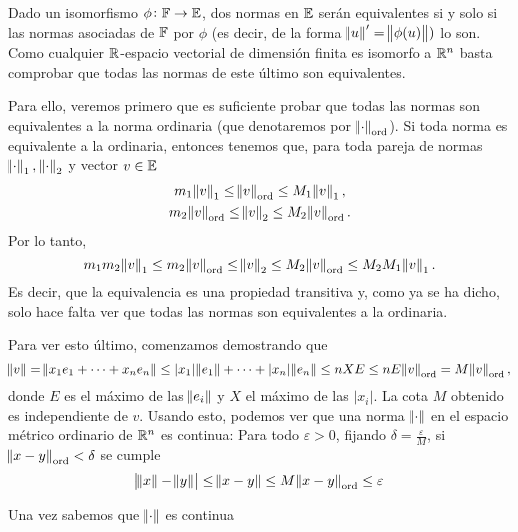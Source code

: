 \begin{eje}
    Dado un isomorfismo $\phi \colon \mathbb{F} \to \mathbb{E}$, dos normas en $\mathbb{E}$ serán equivalentes
    si y solo si las normas asociadas de $\mathbb{F}$ por $\phi$ (es decir, de la forma 
    $\norm{u}'=\norm{\phi(u)})$ lo son.
    Como cualquier $\mathbb{R}$-espacio vectorial de dimensión finita es isomorfo a $\mathbb{R}^n$
    basta comprobar que todas las normas de este último son equivalentes. 

    Para ello, veremos primero que es suficiente probar que todas las normas son 
    equivalentes a la norma ordinaria (que denotaremos por $\norm{\cdot}_{\text{ord}}$). 
    Si toda norma es equivalente a la ordinaria, entonces tenemos que, para toda pareja
    de normas $\norm{\cdot}_1,\,\norm{\cdot}_2$ y vector $v \in \mathbb{E}$ 
    \begin{gather*}
        m_1 \norm{v}_1 \leq \norm{v}_{\text{ord}} \leq M_1 \norm{v}_1, \\
        m_2 \norm{v}_{\text{ord}} \leq \norm{v}_2 \leq M_2 \norm{v}_{\text{ord}}.\\
    \end{gather*}
    Por lo tanto,
    \[
        m_1 m_2 \norm{v}_1 \leq m_2 \norm{v}_{\text{ord}} \leq \norm{v}_2 \leq 
        M_2 \norm{v}_{\text{ord}} \leq M_2  M_1 \norm{v}_1.
    \]
    Es decir, que la equivalencia es una propiedad transitiva y, como ya se ha dicho,
    solo hace falta ver que todas las normas son equivalentes a la ordinaria.

    Para ver esto último, comenzamos demostrando que
    \[
        \norm{v} = \norm{x_1e_1 + \dots + x_ne_n} \leq |x_1|\norm{e_1} + \dots + |x_n|
        \norm{e_n} \leq nXE \leq nE \norm{v}_{\text{ord}}=M\norm{v}_{\text{ord}},
    \]
    donde $E$ es el máximo de las $\norm{e_i}$ y $X$ el máximo de las $|x_i|$.
    La cota $M$ obtenido es independiente de $v$.
    Usando esto, podemos ver que una norma $\norm{\cdot}$
    en el espacio métrico ordinario de $\mathbb{R}^n$ es continua:
    Para todo $\varepsilon > 0$, fijando $\delta = \frac{\varepsilon}{M}$, si
    $\norm{x-y}_{\text{ord}} < \delta$ se cumple
    \[
        \abs{\norm{x} - \norm{y}} \leq \norm{x-y} \leq M\norm{x-y}_{\text{ord}} \leq 
        \varepsilon
    \]
    

    Una vez sabemos que $\norm{\cdot}$ es continua
\end{eje}

